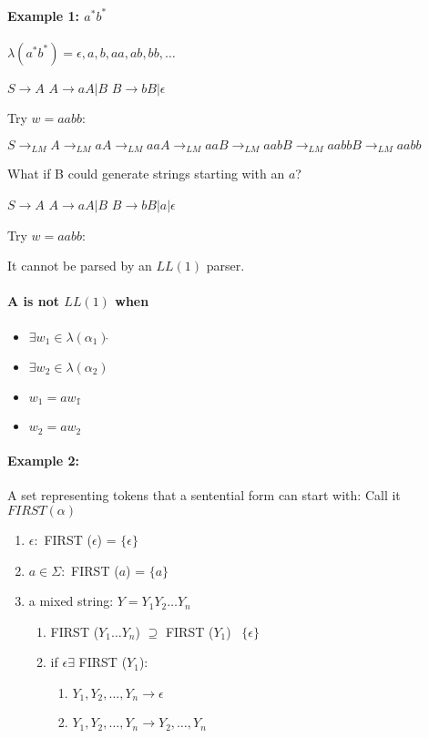 \documentclass[twocolumn]{article}
\begin{document}
\paragraph*{Example 1: $a^* b^*$}


$\lambda(a^* b^*) = {\mathcal{\epsilon}, a, b, aa, ab, bb, \dots}$

$S \to A$
\hfill
$A \to aA | B$
\hfill
$B \to bB | \mathcal{\epsilon}$

Try $w = aabb$:

$S \to_{LM} A \to_{LM} aA \to_{LM} aaA \to_{LM} aaB \to_{LM} aabB \to_{LM} aabbB \to_{LM} aabb$

What if B could generate strings starting with an $a$?

$S \to A$
\hfill
$A \to aA | B$
\hfill
$B \to bB | a | \mathcal{\epsilon}$

Try $w = aabb$:

It cannot be parsed by an $LL(1)$ parser.

\pagebreak

\paragraph*{A is not $LL(1)$ when}
\begin{itemize}
  \item $\exists w_1 \in \lambda (\alpha _1) \hat{}$
  \item $\exists w_2 \in \lambda (\alpha _2)$
  \item $w_1 = aw_1 \hat{}$
  \item $w_2 = aw_2$
\end{itemize}

\paragraph*{Example 2:}
A set representing tokens that a sentential form can start with: Call it $FIRST(\alpha)$

\begin{enumerate}
  \item $\mathcal{\epsilon}: $ FIRST ($\mathcal{\epsilon}$) = $\{\mathcal{\epsilon}\}$
  \item $a\in \Sigma: $ FIRST ($a$) = $\{a\}$
  \item a mixed string: $Y = Y_1 Y_2 \dots Y_n$
        \begin{enumerate}
          \item FIRST ($Y_1 \dots Y_n$) $\supseteq$ FIRST ($Y_1$) \ $\{\mathcal{\epsilon}\}$
          \item if $\mathcal{\epsilon} \exists$ FIRST ($Y_1$):
                \begin{enumerate}
                  \item $Y_1, Y_2, \dots, Y_n \to \mathcal{\epsilon}$
                  \item $Y_1, Y_2, \dots, Y_n \to Y_2, \dots, Y_n$
                \end{enumerate}
        \end{enumerate}
\end{enumerate}
\end{document}
